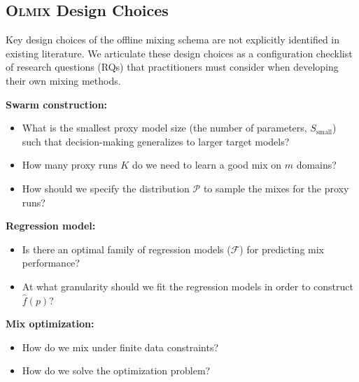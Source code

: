 \documentclass[table]{ai2style/ai2}
\newcommand{\olmix}{\textsc{Olmix}\xspace}
\newcommand{\Ssmall}[0]{S_{\text{small}}}
\begin{document}
\subsection{\olmix Design Choices}\label{sec:design_choices}

Key design choices of the offline mixing schema are not explicitly identified in existing literature. We articulate these design choices as a configuration checklist of research questions (RQs) that practitioners must consider when developing their own mixing methods.

\begin{tcolorbox}[colback=ai2offwhite,colframe=black,boxrule=0.5pt,arc=3pt,left=6pt,right=6pt,top=6pt,bottom=6pt]
\textbf{Swarm construction:}
\begin{itemize}[itemsep=0.00pt,topsep=0pt,leftmargin=30pt]
    \item[\emph{RQ1}] What is the smallest proxy model size (the number of parameters, $\Ssmall$) such that decision-making generalizes to larger target models?
    \item[\emph{RQ2}] How many proxy runs $K$ do we need to learn a good mix on $m$ domains?
    \item[\emph{RQ3}] How should we specify the distribution $\mathcal{P}$ to sample the mixes for the proxy runs?
\end{itemize}

\textbf{Regression model:}
\begin{itemize}[itemsep=0.00pt,topsep=0pt,leftmargin=30pt]
    \item[\emph{RQ4}] Is there an optimal family of regression models ($\mathcal{F}$) for predicting mix performance?
    \item[\emph{RQ5}] At what granularity should we fit the regression models in order to construct $\hat{f}(p)$?
\end{itemize}

\textbf{Mix optimization:}
\begin{itemize}[itemsep=0.00pt,topsep=0pt,leftmargin=30pt]
    \item[\emph{RQ6}] How do we mix under finite data constraints?
    \item[\emph{RQ7}] How do we solve the optimization problem?
\end{itemize}
\end{tcolorbox}
\end{document}
